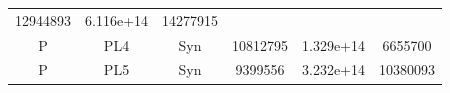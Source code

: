 \documentclass[]{article}
\begin{document}
\begin{longtable}[]{@{}cccccc@{}}
\begin{minipage}[t]{0.12\columnwidth}
12944893
\strut\end{minipage} &
\begin{minipage}[t]{0.12\columnwidth}\centering\strut
6.116e+14
\strut\end{minipage} &
\begin{minipage}[t]{0.12\columnwidth}\centering\strut
14277915
\strut\end{minipage}\tabularnewline
\begin{minipage}[t]{0.07\columnwidth}\centering\strut
P
\strut\end{minipage} &
\begin{minipage}[t]{0.07\columnwidth}\centering\strut
PL4
\strut\end{minipage} &
\begin{minipage}[t]{0.12\columnwidth}\centering\strut
Syn
\strut\end{minipage} &
\begin{minipage}[t]{0.12\columnwidth}\centering\strut
10812795
\strut\end{minipage} &
\begin{minipage}[t]{0.12\columnwidth}\centering\strut
1.329e+14
\strut\end{minipage} &
\begin{minipage}[t]{0.12\columnwidth}\centering\strut
6655700
\strut\end{minipage}\tabularnewline
\begin{minipage}[t]{0.07\columnwidth}\centering\strut
P
\strut\end{minipage} &
\begin{minipage}[t]{0.07\columnwidth}\centering\strut
PL5
\strut\end{minipage} &
\begin{minipage}[t]{0.12\columnwidth}\centering\strut
Syn
\strut\end{minipage} &
\begin{minipage}[t]{0.12\columnwidth}\centering\strut
9399556
\strut\end{minipage} &
\begin{minipage}[t]{0.12\columnwidth}\centering\strut
3.232e+14
\strut\end{minipage} &
\begin{minipage}[t]{0.12\columnwidth}\centering\strut
10380093
\strut\end{minipage}\tabularnewline
\bottomrule
\end{longtable}
\end{document}
